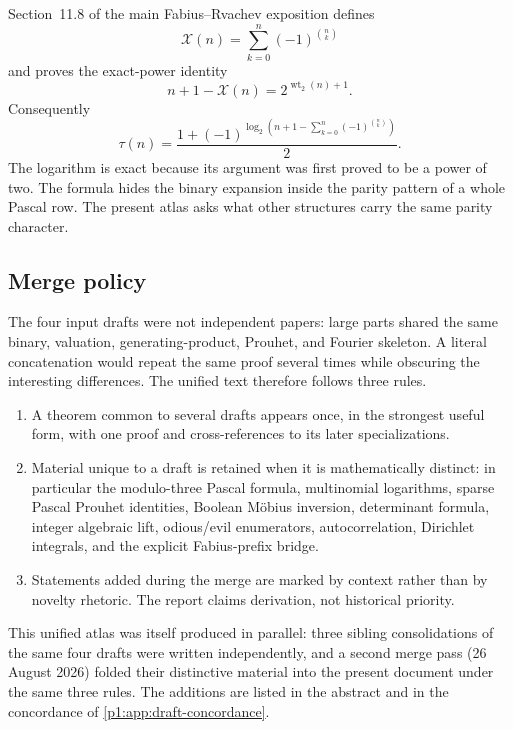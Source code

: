 \documentclass[11pt,oneside]{article}
\numberwithin{equation}{section}
\theoremstyle{definition}
\theoremstyle{remark}
\newcommand{\wt}{\operatorname{wt}_2}
\begin{document}
Section~11.8 of the main Fabius--Rvachev exposition defines
\begin{equation}
  \mathcal X(n)=\sum_{k=0}^{n}(-1)^{\binom nk}
  \label{p1:eq:source-X}
\end{equation}
and proves the exact-power identity
\begin{equation}
  n+1-\mathcal X(n)=2^{\wt(n)+1}.
  \label{p1:eq:source-power}
\end{equation}
Consequently
\begin{equation}
  \tau(n)=
  \frac{1+(-1)^{\log_2\!\left(n+1-
       \sum_{k=0}^{n}(-1)^{\binom nk}\right)}}{2}.
  \label{p1:eq:source-binomial-log}
\end{equation}
The logarithm is exact because its argument was first proved to be a power of
two.  The formula hides the binary expansion inside the parity pattern of a
whole Pascal row.  The present atlas asks what other structures carry the same
parity character.

\subsection{Merge policy}

The four input drafts were not independent papers: large parts shared the same
binary, valuation, generating-product, Prouhet, and Fourier skeleton.  A literal
concatenation would repeat the same proof several times while obscuring the
interesting differences.  The unified text therefore follows three rules.

\begin{enumerate}
\item A theorem common to several drafts appears once, in the strongest useful
      form, with one proof and cross-references to its later specializations.
\item Material unique to a draft is retained when it is mathematically distinct:
      in particular the modulo-three Pascal formula, multinomial logarithms,
      sparse Pascal Prouhet identities, Boolean M\"obius inversion, determinant
      formula, integer algebraic lift, odious/evil enumerators, autocorrelation,
      Dirichlet integrals, and the explicit Fabius-prefix bridge.
\item Statements added during the merge are marked by context rather than by
      novelty rhetoric.  The report claims derivation, not historical priority.
\end{enumerate}

This unified atlas was itself produced in parallel: three sibling
consolidations of the same four drafts were written independently, and a
second merge pass (26 August 2026) folded their distinctive material into the
present document under the same three rules.  The additions are listed in the
abstract and in the concordance of \cref{p1:app:draft-concordance}.
\end{document}
